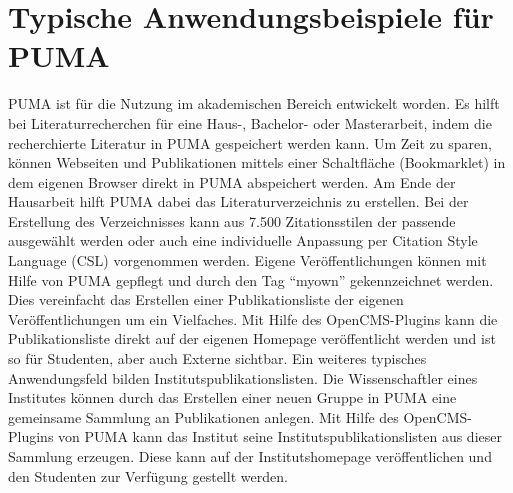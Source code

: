 \section{Typische Anwendungsbeispiele für PUMA}
PUMA ist für die Nutzung im akademischen Bereich entwickelt worden.
Es hilft bei Literaturrecherchen für eine Haus-, Bachelor- oder Masterarbeit, indem die recherchierte Literatur in PUMA gespeichert werden kann. Um Zeit zu sparen, können Webseiten und Publikationen mittels einer Schaltfläche (Bookmarklet) in dem eigenen Browser direkt in PUMA abspeichert werden. Am Ende der Hausarbeit hilft PUMA dabei das Literaturverzeichnis zu erstellen. Bei der Erstellung des Verzeichnisses kann aus 7.500 Zitationsstilen der passende ausgewählt werden oder auch eine individuelle Anpassung per Citation Style Language (CSL) vorgenommen werden.
\newline 
Eigene Veröffentlichungen können mit Hilfe von PUMA gepflegt und  durch den Tag \enquote{myown} gekennzeichnet werden. Dies vereinfacht das Erstellen einer Publikationsliste der eigenen Veröffentlichungen um ein Vielfaches. Mit Hilfe des OpenCMS-Plugins kann die Publikationsliste direkt auf der eigenen Homepage veröffentlicht werden und ist so für Studenten, aber auch Externe sichtbar.
\newline 
Ein weiteres typisches Anwendungsfeld bilden Institutspublikationslisten. Die Wissenschaftler eines Institutes können durch das Erstellen einer neuen Gruppe in PUMA eine gemeinsame Sammlung an Publikationen anlegen. Mit Hilfe des OpenCMS-Plugins von PUMA kann das Institut seine Institutspublikationslisten aus dieser Sammlung erzeugen. Diese kann auf der Institutshomepage veröffentlichen und den Studenten zur Verfügung gestellt werden.

   
